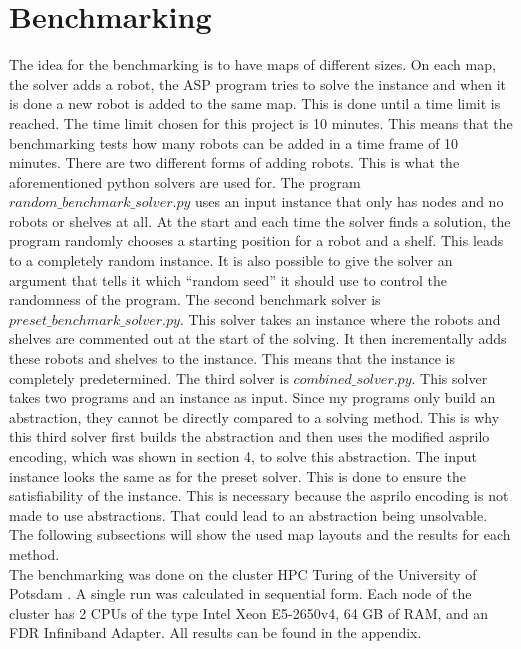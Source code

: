 \documentclass[runningheads]{llncs}
\begin{document}
\section{Benchmarking}
The idea for the benchmarking is to have maps of different sizes. On each map, the solver adds a robot, the ASP program tries to solve the instance and when it is done a new robot is added to the same map. This is done until a time limit is reached. The time limit chosen for this project is 10 minutes. This means that the benchmarking tests how many robots can be added in a time frame of 10 minutes. There are two different forms of adding robots. This is what the aforementioned python solvers are used for. The program $random\_benchmark\_solver.py$ uses an input instance that only has nodes and no robots or shelves at all. At the start and each time the solver finds a solution, the program randomly chooses a starting position for a robot and a shelf. This leads to a completely random instance. It is also possible to give the solver an argument that tells it which ``random seed'' it should use to control the randomness of the program. The second benchmark solver is $preset\_benchmark\_solver.py$. This solver takes an instance where the robots and shelves are commented out at the start of the solving. It then incrementally adds these robots and shelves to the instance. This means that the instance is completely predetermined. The third solver is $combined\_solver.py$. This solver takes two programs and an instance as input. Since my programs only build an abstraction, they cannot be directly compared to a solving method. This is why this third solver first builds the abstraction and then uses the modified asprilo encoding, which was shown in section 4, to solve this abstraction. The input instance looks the same as for the preset solver. This is done to ensure the satisfiability of the instance. This is necessary because the asprilo encoding is not made to use abstractions. That could lead to an abstraction being unsolvable. The following subsections will show the used map layouts and the results for each method. \\
The benchmarking was done on the cluster HPC Turing of the University of Potsdam \cite{hpc}. A single run was calculated in sequential form. Each node of the cluster has 2 CPUs of the type Intel Xeon E5-2650v4, 64 GB of RAM, and an FDR Infiniband Adapter. All results can be found in the appendix.
\end{document}
